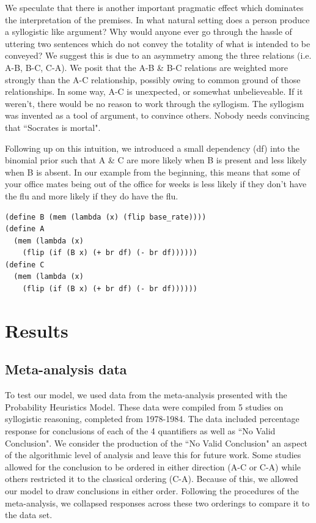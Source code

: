 \documentclass[10pt,letterpaper]{article}
\begin{document}
We speculate that there is another important pragmatic effect which dominates the interpretation of the premises. In what natural setting does a person produce a syllogistic like argument? Why would anyone ever go through the hassle of uttering two sentences which do not convey the totality of what is intended to be conveyed? We suggest this is due to an asymmetry among the three relations (i.e. A-B, B-C, C-A). We posit that the A-B \& B-C relations are weighted more strongly than the A-C relationship, possibly owing to common ground of those relationships. In some way, A-C is unexpected, or somewhat unbelieveable. If it weren't, there would be no reason to work through the syllogism. The syllogism was invented as a tool of argument, to convince others. Nobody needs convincing that ``Socrates is mortal". 

Following up on this intuition, we introduced a small dependency (df) into the binomial prior such that A \& C are more likely when B is present and less likely when B is absent. In our example from the beginning, this means that some of your office mates being out of the office for weeks is less likely if they don't have the flu and more likely if they do have the flu. 


\begin{lstlisting}
(define B (mem (lambda (x) (flip base_rate))))
(define A 
  (mem (lambda (x) 
    (flip (if (B x) (+ br df) (- br df))))))
(define C 
  (mem (lambda (x) 
    (flip (if (B x) (+ br df) (- br df))))))
\end{lstlisting}




\section{Results}

\subsection{Meta-analysis data}
To test our model, we used data from the meta-analysis presented with the Probability Heuristics Model\cite{Chater1999}. These data were compiled from 5 studies on syllogistic reasoning, completed from 1978-1984. The data included percentage response for conclusions of each of the 4 quantifiers as well as ``No Valid Conclusion". We consider the production of the ``No Valid Conclusion" an aspect of the algorithmic level of analysis and leave this for future work. Some studies allowed for the conclusion to be ordered in either direction (A-C or C-A) while others restricted it to the classical ordering (C-A). Because of this, we allowed our model to draw conclusions in either order. Following the procedures of the meta-analysis, we collapsed responses across these two orderings to compare it to the data set.
\end{document}
